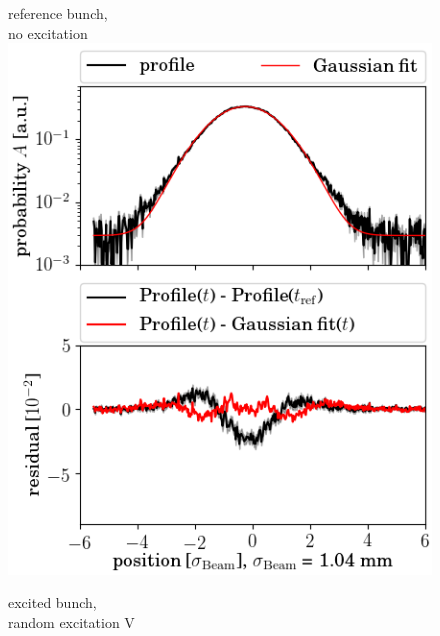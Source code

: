 \documentclass[%
 reprint,
 amsmath,amssymb,
 aps,
prstab,
longbibliography
]{revtex4-1}
\begin{document}
\begin{figure}
	\begin{minipage}[t]{0.49\linewidth}
		\centering
		reference bunch,\\ no excitation
		\includegraphics[width=1.0\linewidth]{profile_v_ranv_slot_1698.png}
	\end{minipage}
	\begin{minipage}[t]{0.49\linewidth}
		\centering
		excited bunch,\\ random excitation V

\end{minipage}
\end{figure}
\end{document}
